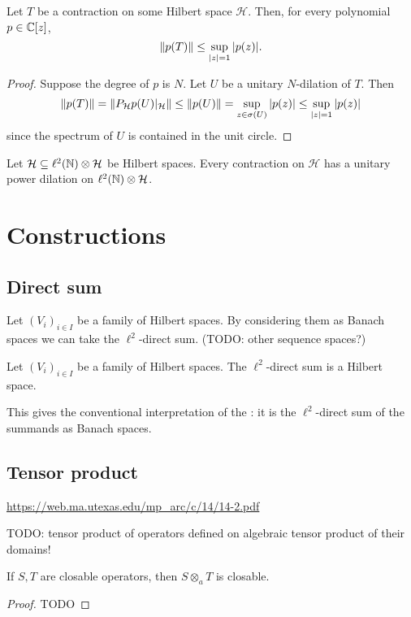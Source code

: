 \begin{proposition}
Let $T$ be a contraction on some Hilbert space $\mathcal{H}$. Then, for every polynomial $p\in\mathbb{C}[z]$,
\[ \lVert p(T)\rVert\leq \sup_{|z|=1}|p(z)|. \]
\end{proposition}
\begin{proof}
Suppose the degree of $p$ is $N$. Let $U$ be a unitary $N$-dilation of $T$. Then
\[ \lVert p(T)\rVert = \lVert P_\mathcal{H}p(U)|_\mathcal{H}\rVert\leq \lVert p(U)\rVert = \sup_{z\in\sigma(U)}|p(z)| \leq \sup_{|z|=1}|p(z)| \]
since the spectrum of $U$ is contained in the unit circle.
\end{proof}

\begin{theorem}
Let $\mathcal{H} \subseteq \ell^2(\mathbb{N})\otimes\mathcal{H}$ be Hilbert spaces. Every contraction on $\mathcal{H}$ has a unitary power dilation on $\ell^2(\mathbb{N})\otimes\mathcal{H}$.
\end{theorem}




\section{Constructions}
\subsection{Direct sum}

Let $(V_i)_{i\in I}$ be a family of Hilbert spaces. By considering them as Banach spaces we can take the $\ell^2$-direct sum. (TODO: other sequence spaces?)
\begin{proposition}
Let $(V_i)_{i\in I}$ be a family of Hilbert spaces. The $\ell^2$-direct sum is a Hilbert space.
\end{proposition}
This gives the conventional interpretation of the : it is the $\ell^2$-direct sum of the summands as Banach spaces.


\subsection{Tensor product}
\url{https://web.ma.utexas.edu/mp_arc/c/14/14-2.pdf}

TODO: tensor product of operators defined on algebraic tensor product of their domains!

\begin{proposition}
If $S,T$ are closable operators, then $S\otimes_a T$ is closable.
\end{proposition}
\begin{proof}
TODO
\end{proof}

